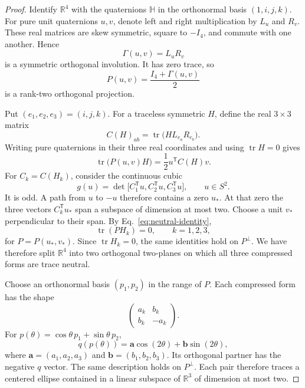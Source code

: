 \documentclass[11pt]{article}
\theoremstyle{remark}
\newcommand{\Tr}{\operatorname{tr}}
\newcommand{\R}{\mathbb{R}}
\begin{document}
\begin{proof}
Identify $\R^4$ with the quaternions $\mathbb H$ in the orthonormal basis
$(1,i,j,k)$.  For pure unit quaternions $u,v$, denote left and right
multiplication by $L_u$ and $R_v$.  These real matrices are skew symmetric,
square to $-I_4$, and commute with one another.  Hence
\begin{equation}
  \Gamma(u,v)=L_uR_v
\end{equation}
is a symmetric orthogonal involution.  It has zero trace, so
\begin{equation}
  P(u,v)=\frac{I_4+\Gamma(u,v)}{2}
  \label{eq:projection}
\end{equation}
is a rank-two orthogonal projection.

Put $(e_1,e_2,e_3)=(i,j,k)$.  For a traceless symmetric $H$, define the real
$3\times3$ matrix
\begin{equation}
 C(H)_{ab}=\Tr\bigl(HL_{e_a}R_{e_b}\bigr).
 \label{eq:c-matrix}
\end{equation}
Writing pure quaternions in their three real coordinates and using
$\Tr H=0$ gives
\begin{equation}
 \Tr\bigl(P(u,v)H\bigr)=\frac12u^{\mathsf T}C(H)v .
 \label{eq:neutral-identity}
\end{equation}
For $C_k=C(H_k)$, consider the continuous cubic
\begin{equation}
 g(u)=\det\big[C_1^{\mathsf T}u,C_2^{\mathsf T}u,C_3^{\mathsf T}u\big],
 \qquad u\in S^2 .
 \label{eq:odd-cubic}
\end{equation}
It is odd.  A path from $u$ to $-u$ therefore contains a zero $u_*$.  At
that zero the three vectors $C_k^{\mathsf T}u_*$ span a subspace of dimension
at most two.  Choose a unit $v_*$ perpendicular to their span.  By
Eq.~\eqref{eq:neutral-identity},
\begin{equation}
 \Tr(PH_k)=0,\qquad k=1,2,3,
 \label{eq:neutral-plane}
\end{equation}
for $P=P(u_*,v_*)$.  Since $\Tr H_k=0$, the same identities hold on
$P^\perp$.  We have therefore split $\R^4$ into two orthogonal two-planes on
which all three compressed forms are trace neutral.

Choose an orthonormal basis $(p_1,p_2)$ in the range of $P$.  Each compressed
form has the shape
\begin{equation}
 \begin{pmatrix}a_k&b_k\\ b_k&-a_k\end{pmatrix}.
\end{equation}
For $p(\theta)=\cos\theta\,p_1+\sin\theta\,p_2$,
\begin{equation}
 q(p(\theta))=\bm a\cos(2\theta)+\bm b\sin(2\theta),
 \label{eq:ellipse}
\end{equation}
where $\bm a=(a_1,a_2,a_3)$ and
$\bm b=(b_1,b_2,b_3)$.  Its orthogonal partner has the negative $q$ vector.
The same description holds on $P^\perp$.  Each pair therefore traces a
centered ellipse contained in a linear subspace of $\R^3$ of dimension at
most two.


\end{proof}
\end{document}
